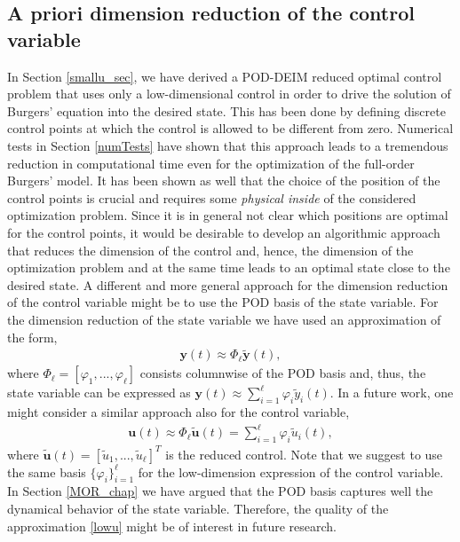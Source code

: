 \subsection*{A priori dimension reduction of the control variable}
In Section \ref{smallu_sec}, we have derived a POD-DEIM reduced optimal control problem that uses only a low-dimensional control in order to drive the solution of Burgers' equation into the desired state. This has been done by defining discrete control points at which the control is allowed to be different from zero. Numerical tests in Section \ref{numTests} have shown that this approach leads to a tremendous reduction in computational time even for the optimization of the full-order Burgers' model. It has been shown as well that the choice of the position of the control points is crucial and requires some \textit{physical inside} of the considered optimization problem. Since it is in general not clear which positions are optimal for the control points, it would be desirable to develop an algorithmic approach that reduces the dimension of the control and, hence, the dimension of the optimization problem and at the same time leads to an optimal state close to the desired state. A different and more general approach for the dimension reduction of the control variable might be to use the POD basis of the state variable. For the dimension reduction of the state variable we have used an approximation of the form,
\begin{align*}
\mathbf{y}(t) \approx \Phi_\ell \mathbf{\tilde y}(t),
\end{align*}
where $\Phi_\ell = [\varphi_1,...,\varphi_\ell]$ consists columnwise of the POD basis and, thus, the state variable can be expressed as $\mathbf{y}(t) \approx \sum_{i=1}^\ell \varphi_i \tilde{y}_i(t)$. In a future work, one might consider a similar approach also for the control variable,
\begin{align}
\label{lowu}
\mathbf{u}(t) \approx \Phi_\ell \mathbf{\tilde u}(t) = \sum_{i=1}^\ell \varphi_i \tilde{u}_i(t),
\end{align}
where $\mathbf{\tilde u}(t) = [\tilde{u}_1,...,\tilde{u}_\ell]^T$ is the reduced control. Note that we suggest to use the same basis $\{\varphi_i\}_{i=1}^\ell$ for the low-dimension expression of the control variable. In Section \ref{MOR_chap} we have argued that the POD basis captures well the dynamical behavior of the state variable. Therefore, the quality of the approximation \eqref{lowu} might be of interest in future research.
